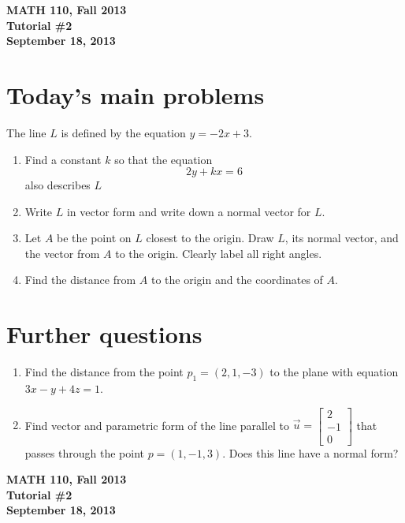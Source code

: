 \documentclass[11pt]{exam}
\newcommand{\mat}[1]{\begin{bmatrix}#1\end{bmatrix}}
\newcommand{\mthCourse}{MATH 110}
\newcommand{\mthTerm}{Fall 2013}
\newcommand{\mthTutorialNumber}{2}
\newcommand{\mthDate}{September 18, 2013}
\begin{document}
{\large
	\begin{center}
		{\bf \mthCourse, \mthTerm}\\ 
		{\bf Tutorial \#\mthTutorialNumber}\\
		{\bf \mthDate}
	\end{center}
}

\section*{Today's main problems}

The line $L$ is defined by the equation $y=-2x+3$.  
\begin{enumerate}
	\item Find a constant $k$ so that the equation
	\[
		2y+kx=6
	\]
	also describes $L$
	\item Write $L$ in vector form and write down a normal vector for $L$.
	\item Let $A$ be the point on $L$ closest to the origin. 
	Draw $L$, its normal vector, and the vector from $A$ to the origin. 
	Clearly label all right angles.
	\item Find the distance from $A$ to the origin and the coordinates of $A$.
\end{enumerate}


\section*{Further questions}

\begin{enumerate}[resume]
	\item  Find the distance from the point $p_1=(2,1,-3)$ to
	the plane with equation $3x-y+4z=1$.

	\item Find vector and parametric form of the line parallel to
	$\vec u=\mat{2\\-1\\0}$ that passes through the point $p=(1,-1,3)$.
	Does this line have a normal form?
\end{enumerate}

\newpage
{
	\begin{center}
		{\bf \mthCourse, \mthTerm}\\ 
		{\bf Tutorial \#\mthTutorialNumber}\\
		{\bf \mthDate}
	\end{center}
}
\end{document}
